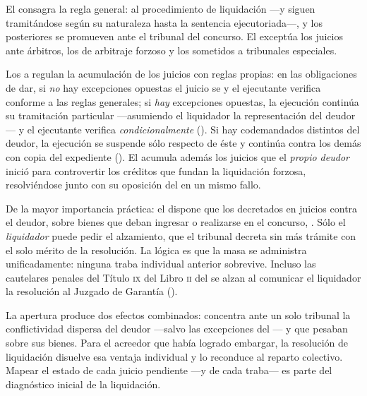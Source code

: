 El  consagra la regla general:  al procedimiento de liquidación ---y siguen tramitándose según su naturaleza
hasta la sentencia ejecutoriada---, y los posteriores se promueven ante el tribunal del concurso.
El  exceptúa los juicios ante árbitros, los de arbitraje forzoso y los sometidos a
tribunales especiales.

Los  a  regulan la acumulación de los juicios  con reglas
propias: en las obligaciones de dar, si \emph{no} hay excepciones opuestas el juicio se
 y el ejecutante verifica conforme a las reglas generales; si \emph{hay}
excepciones opuestas, la ejecución continúa su tramitación particular ---asumiendo el liquidador la
representación del deudor--- y el ejecutante verifica \emph{condicionalmente} (). Si hay
codemandados distintos del deudor, la ejecución se suspende sólo respecto de éste y continúa contra
los demás con copia del expediente (). El  acumula además los juicios que el
\emph{propio deudor} inició para controvertir los créditos que fundan la liquidación forzosa,
resolviéndose junto con su oposición del  en un mismo fallo.

\begin{alerta}
De la mayor importancia práctica: el  dispone que los  decretados en juicios contra el deudor, sobre bienes que deban ingresar o realizarse
en el concurso, . Sólo
el \emph{liquidador} puede pedir el alzamiento, que el tribunal decreta sin más trámite con el solo
mérito de la resolución. La lógica es que la masa se administra unificadamente: ninguna traba
individual anterior sobrevive. Incluso las cautelares penales del Título \textsc{ix} del Libro
\textsc{ii} del \cpen{} se alzan al comunicar el liquidador la resolución al Juzgado de Garantía
().
\end{alerta}

\begin{foco}
La apertura produce dos efectos combinados: concentra ante un solo tribunal la conflictividad
dispersa del deudor ---salvo las excepciones del --- y  que pesaban sobre sus bienes. Para el acreedor que había logrado embargar,
la resolución de liquidación disuelve esa ventaja individual y lo reconduce al reparto colectivo.
Mapear el estado de cada juicio pendiente ---y de cada traba--- es parte del diagnóstico inicial de
la liquidación.
\end{foco}

